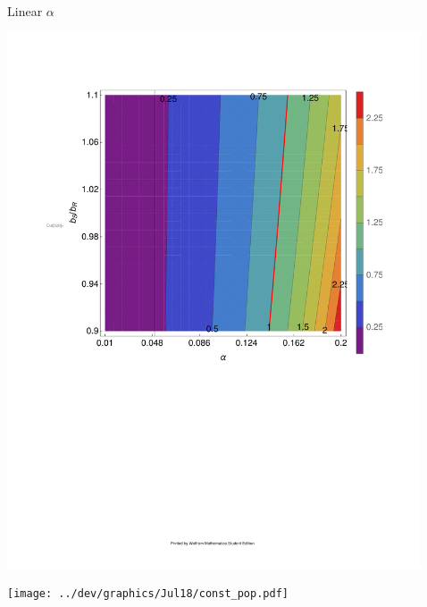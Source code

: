 \documentclass[final]{beamer}
\newlength{\sepwid}
\newlength{\onecolwid}
\begin{document}
\begin{frame}[t]
\begin{block}
\begin{columns}[t]

\begin{column}{\sepwid}\end{column} %

\begin{column}{\onecolwid}
  \begin{alertblock}{Linear $\alpha$}
    \begin{center}
      \includegraphics[width=\columnwidth]{../dev/graphics/Jul14/const_alpha_contour.pdf}

      \texttt{[image: ../dev/graphics/Jul18/const\_pop.pdf]}
    \end{center}
  \end{alertblock}
\end{column}
\begin{column}{\sepwid}\end{column} %


\end{columns}
\end{block}
\end{frame}
\end{document}
